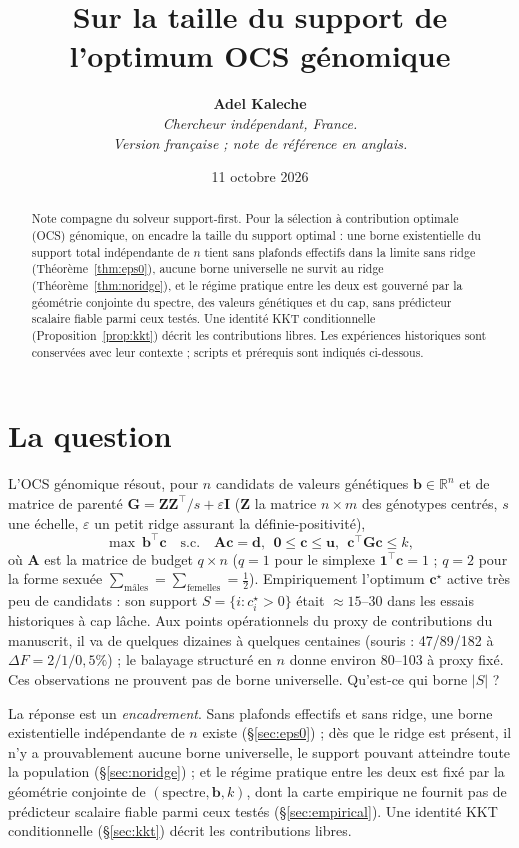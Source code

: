 \documentclass[11pt]{article}
\title{\bfseries Sur la taille du support de l'optimum OCS génomique}
\author{\textbf{Adel Kaleche}\\[2pt] \small\itshape Chercheur indépendant, France. \\ \small\itshape Version française ; note de référence en anglais.}
\date{11 octobre 2026}
\theoremstyle{plain}
\newcommand{\tp}{^{\top}}
\newcommand{\bc}{\mathbf{c}}
\newcommand{\bb}{\mathbf{b}}
\newcommand{\bG}{\mathbf{G}}
\newcommand{\bZ}{\mathbf{Z}}
\newcommand{\bA}{\mathbf{A}}
\newcommand{\bd}{\mathbf{d}}
\newcommand{\bu}{\mathbf{u}}
\newcommand{\bone}{\mathbf{1}}
\begin{document}
\maketitle

\begin{abstract}
\noindent
Note compagne du solveur support-first. Pour la sélection à contribution optimale (OCS)
génomique, on encadre la taille du support optimal : une borne existentielle du support total indépendante de $n$
tient sans plafonds effectifs dans la limite sans ridge (Théorème~\ref{thm:eps0}), aucune borne universelle ne
survit au ridge (Théorème~\ref{thm:noridge}), et le régime pratique entre les deux est
gouverné par la géométrie conjointe du spectre, des valeurs génétiques et du cap, sans prédicteur scalaire fiable parmi ceux testés. Une identité KKT conditionnelle (Proposition~\ref{prop:kkt}) décrit les contributions libres.
Les expériences historiques sont conservées avec leur contexte ; scripts et prérequis sont indiqués ci-dessous.
\end{abstract}

\section{La question}

L'OCS génomique résout, pour $n$ candidats de valeurs génétiques $\bb \in \mathbb{R}^n$ et de
matrice de parenté $\bG = \bZ\bZ\tp/s + \varepsilon\mathbf{I}$ ($\bZ$ la matrice $n\times m$ des
génotypes centrés, $s$ une échelle, $\varepsilon$ un petit ridge assurant la définie-positivité),
\begin{equation}\label{eq:ocs}
  \max\ \bb\tp\bc \quad\text{s.c.}\quad \bA\bc = \bd,\ \ \mathbf{0} \le \bc \le \bu,\ \ \bc\tp\bG\bc \le k,
\end{equation}
où $\bA$ est la matrice de budget $q\times n$ ($q=1$ pour le simplexe $\bone\tp\bc=1$ ; $q=2$
pour la forme sexuée $\sum_{\text{mâles}} = \sum_{\text{femelles}} = \tfrac12$). Empiriquement
l'optimum $\bc^\star$ active très peu de candidats : son support $S = \{i : c^\star_i > 0\}$
était $\approx15$--$30$ dans les essais historiques à cap lâche. Aux points opérationnels du proxy de contributions du manuscrit, il va de quelques dizaines à quelques centaines (souris : 47/89/182 à $\Delta F=2/1/0{,}5\%$) ; le balayage structuré en $n$ donne environ 80--103 à proxy fixé. Ces observations ne prouvent pas de borne universelle. Qu'est-ce
qui borne $|S|$ ?

La réponse est un \emph{encadrement}. Sans plafonds effectifs et sans ridge, une borne existentielle indépendante
de $n$ existe (\S\ref{sec:eps0}) ; dès que le ridge est présent, il n'y a prouvablement aucune
borne universelle, le support pouvant atteindre toute la population (\S\ref{sec:noridge}) ; et
le régime pratique entre les deux est fixé par la géométrie conjointe de $(\text{spectre}, \bb, k)$,
dont la carte empirique ne fournit pas de prédicteur scalaire fiable parmi ceux testés
(\S\ref{sec:empirical}). Une identité KKT conditionnelle (\S\ref{sec:kkt}) décrit les contributions libres.
\end{document}
